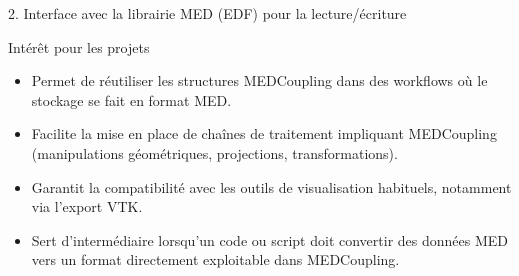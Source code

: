 \begin{frame}{2. Interface avec la librairie MED (EDF) pour la
lecture/écriture}
\begin{block}{Intérêt pour les projets}
\protect\hypertarget{intuxe9ruxeat-pour-les-projets-1}{}
\begin{itemize}
\tightlist
\item
  Permet de réutiliser les structures MEDCoupling dans des workflows où
  le stockage se fait en format MED.
\item
  Facilite la mise en place de chaînes de traitement impliquant
  MEDCoupling (manipulations géométriques, projections,
  transformations).
\item
  Garantit la compatibilité avec les outils de visualisation habituels,
  notamment via l'export VTK.
\item
  Sert d'intermédiaire lorsqu'un code ou script doit convertir des
  données MED vers un format directement exploitable dans MEDCoupling.
\end{itemize}
\end{block}
\end{frame}

